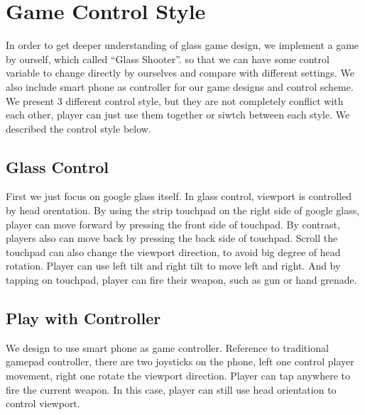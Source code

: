 \documentclass{sigchi}
\begin{document}

\section{Game Control Style}
In order to get deeper understanding of glass game design, we implement a game by ourself, which called ``Glass Shooter''. so that we can have some control variable to change directly by ourselves and compare with different settings. We also include smart phone as controller for our game designs and control scheme. We present 3 different control style, but they are not completely conflict with each other, player can just use them together or siwtch between each style. We described the control style below. 


\subsection{Glass Control}
First we just focus on google glass itself. In glass control, viewport is controlled by head orentation. By using the strip touchpad on the right side of google glass, player can move forward by pressing the front side of touchpad. By contrast, players also can move back by pressing the back side of touchpad. Scroll the touchpad can also change the viewport direction, to avoid big degree of head rotation. Player can use left tilt and right tilt to move left and right. And by tapping on touchpad, player can fire their weapon, such as gun or hand grenade. 

\subsection{Play with Controller}
We design to use smart phone as game controller. Reference to traditional gamepad controller, there are two joysticks on the phone, left one control player movement, right one rotate the viewport direction. Player can tap anywhere to fire the current weapon. In this case, player can still use head orientation to control viewport.
\end{document}
